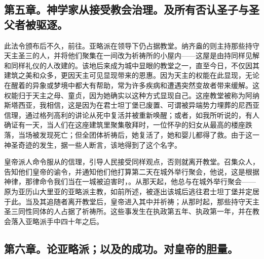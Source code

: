 
\subsection{第五章。神学家从接受教会治理。及所有否认圣子与圣父者被驱逐。}

此法令颁布后不久，前往。亚略派在领导下仍占据教堂。纳齐盎的则主持那些持守天主圣三的人，并将他们聚集在一间改为祈祷所的小屋内——这屋是由持同样见解和同样礼仪的人改建的。该地后来成为城中显眼的教堂之一，直至今日，不仅因其建筑之美和众多，更因天主可见显现带来的恩惠。因为天主的权能在此显现，无论在醒着的异象或梦境中都大有帮助，常为许多疾病和遭遇突然变故者带来缓解。这权能归于天主之母、童贞，因为她确实以这种方式显现自己。这座教堂被称为阿纳斯塔西亚，我相信，这是因为在君士坦丁堡已废置、可谓被异端势力埋葬的尼西亚信理，通过格列高利的讲论从死中复活并被重新唤醒；或者，如我所听说的，有人确证有一天，当人们在这座建筑里聚集敬拜时，一位怀孕的妇女从最高的楼座跌落，当场被发现死亡；但全团体祈祷后，她复活了，她和婴儿都得了救。由于这一神圣奇迹的发生，据一些人断言，该地得到了这个名字。\par

皇帝派人命令服从的信理，引导人民接受同样观点，否则就离开教堂。召集众人，告知他们皇帝的谕令，并通知他们他打算第二天在城外举行聚会，他说，这是根据神律，那律命令我们当在一城被迫害时，。从那天起，他总与在城外举行聚会——原为亚历山大里亚的亚略派主教，如前所述，被逐出该城后逃往君士坦丁堡并定居于此。当及其追随者离开教堂后，皇帝进入其中并祈祷；从那时起，那些持守天主圣三同性同体的人占据了祈祷所。这些事发生在执政第五年、执政第一年，并在教会落入亚略派手中四十年之后。\par


\subsection{第六章。论亚略派；以及的成功。对皇帝的胆量。}

